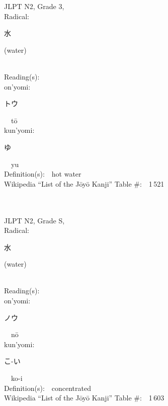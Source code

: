 \begin{multicols}{2}
{JLPT N2, Grade 3, \\Radical:\ \ {\begin{CJK}{UTF8}{min} 水 \end{CJK}} (water) } \\
Reading(s):\ \ \\
{\hspace*{1em}}on'yomi:\ \ \\
{\hspace*{2em}}{\begin{CJK}{UTF8}{min} トウ \end{CJK}}\ \ t\=o\ \ \\
{\hspace*{1em}}kun'yomi:\ \ \\
{\hspace*{2em}}{\begin{CJK}{UTF8}{min} ゆ \end{CJK}}\ \ yu\ \ \\
Definition(s):\ \ hot water \\
Wikipedia ``List of the J\=oy\=o Kanji'' Table \#:\ \ 1\,521 \\
\ \ \\
{\fontsize{34pt}{40pt}  }\ \ \\  %
{JLPT N2, Grade S, \\Radical:\ \ {\begin{CJK}{UTF8}{min} 水 \end{CJK}} (water) } \\
Reading(s):\ \ \\
{\hspace*{1em}}on'yomi:\ \ \\
{\hspace*{2em}}{\begin{CJK}{UTF8}{min} ノウ \end{CJK}}\ \ n\=o\ \ \\
{\hspace*{1em}}kun'yomi:\ \ \\
{\hspace*{2em}}{\begin{CJK}{UTF8}{min} こ-い \end{CJK}}\ \ ko-i\ \ \\
Definition(s):\ \ concentrated \\
Wikipedia ``List of the J\=oy\=o Kanji'' Table \#:\ \ 1\,603 \\

\end{multicols}
